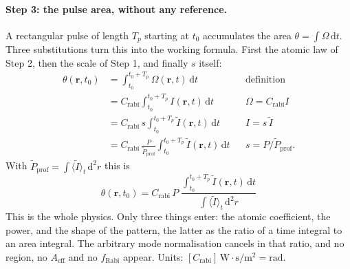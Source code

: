 \paragraph{Step 3: the pulse area, without any reference.}
A rectangular pulse of length $T_p$ starting at $t_0$ accumulates the area
$\theta=\int\Omega\,\mathrm dt$. Three substitutions turn this into the working
formula. First the atomic law of Step 2, then the scale of Step 1, and finally
$s$ itself:
\begin{align}
\theta(\mathbf r,t_0)
&=\int_{t_0}^{t_0+T_p}\!\!\Omega(\mathbf r,t)\,\mathrm dt
&&\text{definition}\\
&=C_\mathrm{rabi}\int_{t_0}^{t_0+T_p}\!\! I(\mathbf r,t)\,\mathrm dt
&&\Omega=C_\mathrm{rabi}I\\
&=C_\mathrm{rabi}\,s\int_{t_0}^{t_0+T_p}\!\!\tilde I(\mathbf r,t)\,\mathrm dt
&&I=s\,\tilde I\\
&=C_\mathrm{rabi}\,\frac{P}{\tilde P_\mathrm{prof}}
  \int_{t_0}^{t_0+T_p}\!\!\tilde I(\mathbf r,t)\,\mathrm dt
&&s=P/\tilde P_\mathrm{prof} .
\end{align}
With $\tilde P_\mathrm{prof}=\int\langle\tilde I\rangle_t\,\mathrm d^2r$ this is
\begin{equation}
\boxed{\;
\theta(\mathbf r,t_0)
=C_\mathrm{rabi}\,P\;
\frac{\displaystyle\int_{t_0}^{t_0+T_p}\!\tilde I(\mathbf r,t)\,\mathrm dt}
     {\displaystyle\int\!\langle\tilde I\rangle_t\,\mathrm d^2r}\; }
\end{equation}
This is the whole physics. Only three things enter: the atomic coefficient, the
power, and the shape of the pattern, the latter as the ratio of a time integral
to an area integral. The arbitrary mode normalisation cancels in that ratio,
and no region, no $A_\mathrm{eff}$ and no $f_\mathrm{Rabi}$ appear. Units:
$[C_\mathrm{rabi}]\,\mathrm{W}\cdot\mathrm{s}/\mathrm{m^2}=\mathrm{rad}$.

